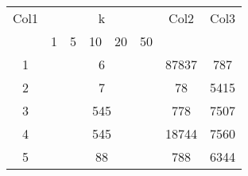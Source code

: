 
\begin{center}
    \begin{tabular}{c | c c c c c | c c} 
     \hline
     Col1 & \multicolumn{5}{c|}{k} & Col2 & Col3 \\ [0.5ex] 
      & 1 & 5 & 10 & 20 & 50 &  &  \\ [0.5ex] 
     \hline
     1 & \multicolumn{5}{c|}{6} & 87837 & 787 \\ 
     \hline
     2 & \multicolumn{5}{c|}{7} & 78 & 5415 \\
     \hline
     3 & \multicolumn{5}{c|}{545} & 778 & 7507 \\
     \hline
     4 & \multicolumn{5}{c|}{545} & 18744 & 7560 \\
     \hline
     5 & \multicolumn{5}{c|}{88} & 788 & 6344 \\ [1ex] 
     \hline
    \end{tabular}
\end{center}